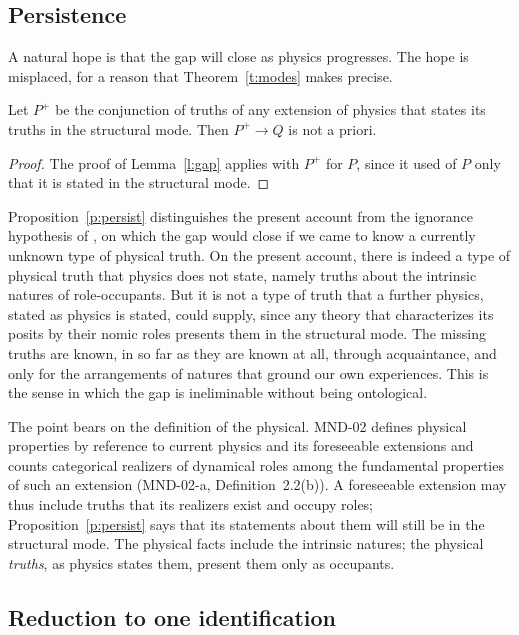 \documentclass{situationist-preprint}
\begin{document}
\subsection{Persistence}

A natural hope is that the gap will close as physics progresses. The hope is misplaced, for a reason that Theorem~\ref{t:modes} makes precise.

\begin{proposition}[Persistence]\label{p:persist}
Let $P^{+}$ be the conjunction of truths of any extension of physics that states its truths in the structural mode. Then $P^{+} \to Q$ is not a priori.
\end{proposition}

\begin{proof}
The proof of Lemma~\ref{l:gap} applies with $P^{+}$ for $P$, since it used of $P$ only that it is stated in the structural mode.
\end{proof}

Proposition~\ref{p:persist} distinguishes the present account from the ignorance hypothesis of \citet{Stoljar2006}, on which the gap would close if we came to know a currently unknown type of physical truth. On the present account, there is indeed a type of physical truth that physics does not state, namely truths about the intrinsic natures of role-occupants. But it is not a type of truth that a further physics, stated as physics is stated, could supply, since any theory that characterizes its posits by their nomic roles presents them in the structural mode. The missing truths are known, in so far as they are known at all, through acquaintance, and only for the arrangements of natures that ground our own experiences. This is the sense in which the gap is ineliminable without being ontological.

The point bears on the definition of the physical. MND-02 defines physical properties by reference to current physics and its foreseeable extensions and counts categorical realizers of dynamical roles among the fundamental properties of such an extension (MND-02-a, Definition~2.2(b)). A foreseeable extension may thus include truths that its realizers exist and occupy roles; Proposition~\ref{p:persist} says that its statements about them will still be in the structural mode. The physical facts include the intrinsic natures; the physical \emph{truths}, as physics states them, present them only as occupants.

\subsection{Reduction to one identification}
\end{document}
